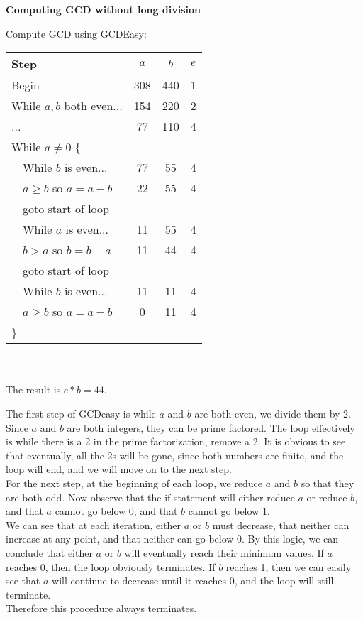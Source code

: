 \documentclass[12pt]{article}
\begin{document}
\begin{list}{.}{}
\begin{list}{)}{}
\end{list}

\item \textbf{Computing GCD without long division}
\begin{list}{)}{}
\item Compute GCD using GCDEasy: \\
\begin{tabular}{|l|c|c|c|}
\hline
Step & $a$ & $b$ & $e$ \\
\hline
Begin & 308 & 440 & 1\\
While $a,b$ both even... & 154 & 220 & 2\\
... & 77 & 110 & 4\\
While $a \neq 0$ \{ & & & \\
\ \ While $b$ is even... & 77 & 55 & 4\\
\ \ $a \ge b$ so $a = a-b$ & 22 & 55 & 4\\
\ \ goto start of loop & & & \\
\ \ While $a$ is even... & 11 & 55 & 4\\
\ \ $b > a$ so $b = b-a$ & 11 & 44 & 4\\
\ \ goto start of loop & & & \\
\ \ While $b$ is even... & 11 & 11 & 4\\
\ \ $a \ge b$ so $a = a-b$ & 0 & 11 & 4\\
\} & & & \\
\hline
\end{tabular}\\
\\
The result is $e*b = 44$.

\item The first step of GCDeasy is while $a$ and $b$ are both even, we divide
them by 2.  Since $a$ and $b$ are both integers, they can be prime factored.
The loop effectively is while there is a 2 in the prime factorization, remove a
2.  It is obvious to see that eventually, all the 2s will be gone, since both
numbers are finite, and the loop will end, and we will move on to the next
step.\\
For the next step, at the beginning of each loop, we reduce $a$ and $b$ so that
they are both odd.  Now observe that the if statement will either reduce $a$ or
reduce $b$, and that $a$ cannot go below 0, and that $b$ cannot go below 1.\\
We can see that at each iteration, either $a$ or $b$ must decrease, that
neither can increase at any point, and that neither can go below 0.  By this
logic, we can conclude that either $a$ or $b$ will eventually reach their
minimum values.  If $a$ reaches 0, then the loop obviously terminates.  If $b$
reaches 1, then we can easily see that $a$ will continue to decrease until it
reaches 0, and the loop will still terminate.\\
Therefore this procedure always terminates.


\end{list}
\end{list}
\end{document}
